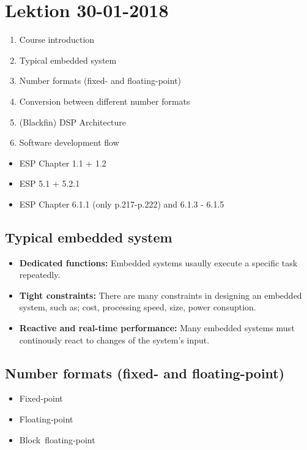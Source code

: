 \section{Lektion 30-01-2018}

\begin{enumerate}
	\item Course introduction
	\item Typical embedded system
	\item Number formats (fixed- and floating-point)
	\item Conversion between different number formats
	\item (Blackfin) DSP Architecture
	\item Software development flow
\end{enumerate}

\begin{mdframed}[style=exampledefault]
\begin{itemize}
	\item ESP Chapter 1.1 + 1.2
	\item ESP 5.1 + 5.2.1
	\item ESP Chapter 6.1.1 (only p.217-p.222) and 6.1.3 - 6.1.5
\end{itemize}
\end{mdframed}

\subsection{Typical embedded system}

\begin{itemize}
	\item \textbf{Dedicated functions:} Embedded systems usaully execute a specific task repeatedly. 
	\item \textbf{Tight constraints:} There are many constraints in designing an embedded system, such as; cost, processing speed, size, power consuption. 
	\item \textbf{Reactive and real-time performance:} Many embedded systems must continously react to changes of the system's input.
\end{itemize}

\subsection{Number formats (fixed- and floating-point)}
\begin{itemize}
	\item Fixed‐point
	\item Floating‐point
	\item Block floating‐point
\end{itemize}

